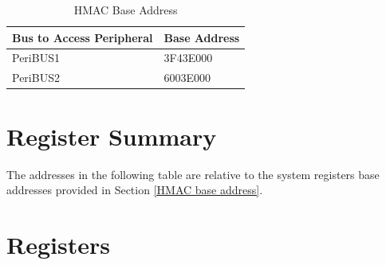 \documentclass[main\_\_EN.tex]{subfiles}
\begin{document}
\begin{longtable}[c]{ | l | C{3cm} | }
\caption{HMAC Base Address}
\label{table:HMAC_Base_Address}
\\\hline
{}
Bus to Access Peripheral & Base Address\\
    \hline
PeriBUS1      & \hexprefix{}3F43E000      \\
    \hline
PeriBUS2      & \hexprefix{}6003E000      \\
    \hline
\end{longtable}


\hypertarget{hmac-reg-summ}{}
\section{Register Summary}


The addresses in the following table are relative to the system registers base addresses provided in Section \ref{HMAC base address}.



\section{Registers}


\end{document}
